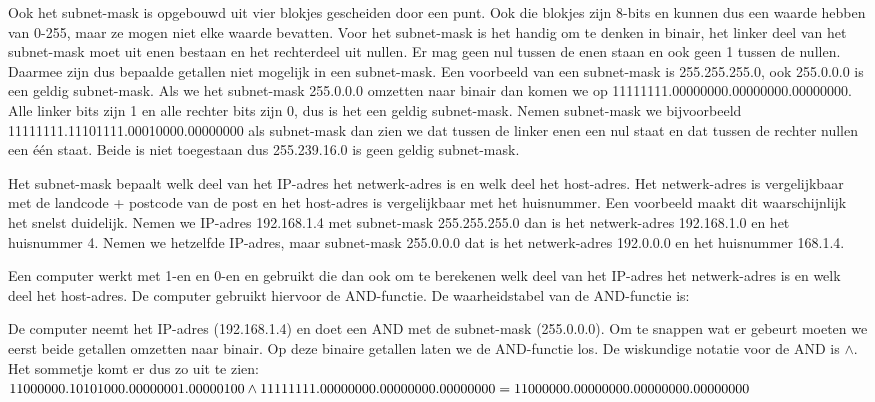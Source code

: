 Ook het subnet-mask is opgebouwd uit vier blokjes gescheiden door een punt. Ook die blokjes zijn 8-bits en kunnen dus een waarde hebben van 0-255, maar ze mogen niet elke waarde bevatten. Voor het subnet-mask is het handig om te denken in binair, het linker deel van het subnet-mask moet uit enen bestaan en het rechterdeel uit nullen. Er mag geen nul tussen de enen staan en ook geen 1 tussen de nullen. Daarmee zijn dus bepaalde getallen niet mogelijk in een subnet-mask. Een voorbeeld van een subnet-mask is 255.255.255.0, ook 255.0.0.0 is een geldig subnet-mask. Als we het subnet-mask 255.0.0.0 omzetten naar binair dan komen we op 11111111.00000000.00000000.00000000. Alle linker bits zijn 1 en alle rechter bits zijn 0, dus is het een geldig subnet-mask. Nemen subnet-mask we bijvoorbeeld 11111111.11101111.00010000.00000000 als subnet-mask dan zien we dat tussen de linker enen een nul staat en dat tussen de rechter nullen een \'e\'en staat. Beide is niet toegestaan dus 255.239.16.0 is geen geldig subnet-mask.

Het subnet-mask bepaalt welk deel van het IP-adres het netwerk-adres is en welk deel het host-adres. Het netwerk-adres is vergelijkbaar met de landcode + postcode van de post en het host-adres is vergelijkbaar met het huisnummer. Een voorbeeld maakt dit waarschijnlijk het snelst duidelijk. Nemen we IP-adres 192.168.1.4 met subnet-mask 255.255.255.0 dan is het netwerk-adres 192.168.1.0 en het huisnummer 4. Nemen we hetzelfde IP-adres, maar subnet-mask 255.0.0.0 dat is het netwerk-adres 192.0.0.0 en het huisnummer 168.1.4.

Een computer werkt met 1-en en 0-en en gebruikt die dan ook om te berekenen welk deel van het IP-adres het netwerk-adres is en welk deel het host-adres. De computer gebruikt hiervoor de AND-functie. De waarheidstabel van de AND-functie is:

De computer neemt het IP-adres (192.168.1.4) en doet een AND met de subnet-mask (255.0.0.0). Om te snappen wat er gebeurt moeten we eerst beide getallen omzetten naar binair. Op deze binaire getallen laten we de AND-functie los. De wiskundige notatie voor de AND is \begin{math}\land\end{math}. Het sommetje komt er dus zo uit te zien:
\begin{math}\newline
11000000.10101000.00000001.00000100 \land \newline
11111111.00000000.00000000.00000000 =     \newline
11000000.00000000.00000000.00000000
\end{math}


